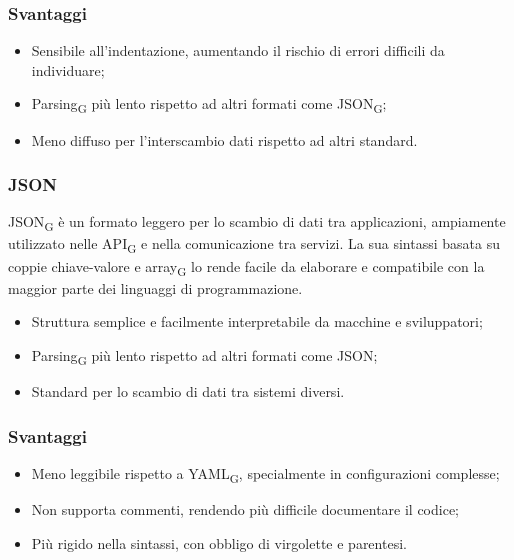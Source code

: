 \subsubsection{Svantaggi}
\begin{itemize}
    \item Sensibile all’indentazione, aumentando il rischio di errori difficili da individuare;
    \item Parsing\textsubscript{G} più lento rispetto ad altri formati come JSON\textsubscript{G};
    \item Meno diffuso per l’interscambio dati rispetto ad altri standard.
\end{itemize}

\subsubsection{JSON}
JSON\textsubscript{G} è un formato leggero per lo scambio di dati tra applicazioni, ampiamente utilizzato nelle API\textsubscript{G} e nella comunicazione tra servizi. La sua sintassi basata su coppie chiave-valore e array\textsubscript{G} lo rende facile da elaborare e compatibile con la maggior parte dei linguaggi di programmazione.
\begin{itemize}
    \item Struttura semplice e facilmente interpretabile da macchine e sviluppatori;
    \item Parsing\textsubscript{G} più lento rispetto ad altri formati come JSON;
    \item Standard per lo scambio di dati tra sistemi diversi.
\end{itemize}
\subsubsection{Svantaggi}
\begin{itemize}
    \item Meno leggibile rispetto a YAML\textsubscript{G}, specialmente in configurazioni complesse;
    \item Non supporta commenti, rendendo più difficile documentare il codice;
    \item Più rigido nella sintassi, con obbligo di virgolette e parentesi.
\end{itemize}
